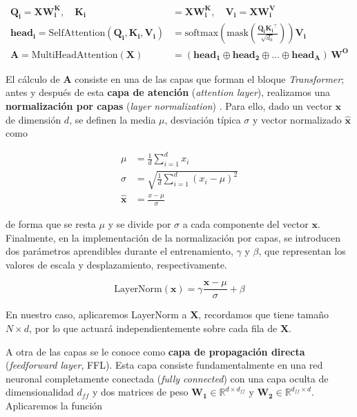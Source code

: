\documentclass[12pt,twoside]{article}
\begin{document}
\begin{align}
\mathbf{Q_i}=\mathbf{XW^K_i}, \quad \mathbf{K_i} &= \mathbf{XW^K_i}, \quad \mathbf{V_i}=\mathbf{XW^V_i} \\
\mathbf{head_i} = \text{SelfAttention}\left( \mathbf{Q_i,K_i,V_i} \right) &= \text{softmax} \left( \text{mask} \left( \frac{\mathbf{Q_i K_i}^\top}{\sqrt{d_k}} \right) \right) \mathbf{V_i} \\
\mathbf{A} = \text{MultiHeadAttention}\left( \mathbf{X} \right) &= \left(\mathbf{head_1}\oplus\mathbf{head_2}\oplus\dots\oplus\mathbf{head_A} \right) \, \mathbf{W^O}
\end{align}

El cálculo de $\mathbf{A}$ consiste en una de las capas que forman el bloque \textit{Transformer}; antes y después de esta \textbf{capa de atención} (\textit{attention layer}), realizamos una \textbf{normalización por capas} (\textit{layer normalization}) \cite{LayerNorm}. Para ello, dado un vector $\mathbf{x}$ de dimensión $d$, se definen la media $\mu$, desviación típica $\sigma$ y vector normalizado $\hat{\mathbf{x}}$ como

\begin{align}
    \mu &= \frac{1}{d}\sum_{i=1}^d x_i \\
    \sigma &= \sqrt{\frac{1}{d}\sum_{i=1}^{d}(x_i-\mu)^{2}} \\
    \hat{\mathbf{x}} &= \frac{x-\mu}{\sigma}
\end{align}

de forma que se resta $\mu$ y se divide por $\sigma$ a cada componente del vector $\mathbf{x}$. Finalmente, en la implementación de la normalización por capas, se introducen dos parámetros aprendibles durante el entrenamiento, $\gamma$ y $\beta$, que representan los valores de escala y desplazamiento, respectivamente.

\begin{equation}
    \text{LayerNorm}(\mathbf{x})=\gamma\frac{\mathbf{x}-\mu}{\sigma}+\beta
\end{equation}

En nuestro caso, aplicaremos LayerNorm a $\mathbf{X}$, recordamos que tiene tamaño $N\times d$, por lo que actuará independientemente sobre cada fila de $\mathbf{X}$.

A otra de las capas se le conoce como \textbf{capa de propagación directa} (\textit{feedforward layer}, FFL). Esta capa consiste fundamentalmente en una red neuronal completamente conectada (\textit{fully connected}) con una capa oculta de dimensionalidad $d_{ff}$ y dos matrices de peso $\mathbf{W_1}\in\mathbb{R}^{d\times d_{ff}}$ y $\mathbf{W_2}\in\mathbb{R}^{d_{ff}\times d}$. Aplicaremos la función
\end{document}
